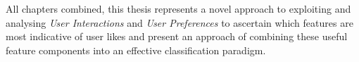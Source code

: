All chapters combined, this thesis represents a novel approach to exploiting and analysing \emph{User Interactions} and \emph{User Preferences} 
to ascertain which features are most indicative of user likes and present an approach of combining these useful feature components into an effective 
classification paradigm.

